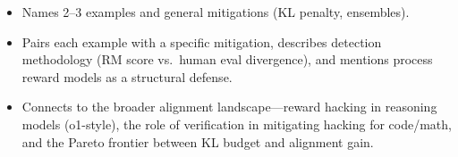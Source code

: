 \begin{interviewq}

\goodgreat
\begin{itemize}
    \item {} Names 2--3 examples and general mitigations (KL penalty, ensembles).
    \item {} Pairs each example with a specific mitigation, describes detection methodology (RM score vs.\ human eval divergence), and mentions process reward models as a structural defense.
    \item {} Connects to the broader alignment landscape---reward hacking in reasoning models (o1-style), the role of verification in mitigating hacking for code/math, and the Pareto frontier between KL budget and alignment gain.
\end{itemize}

\end{interviewq}



